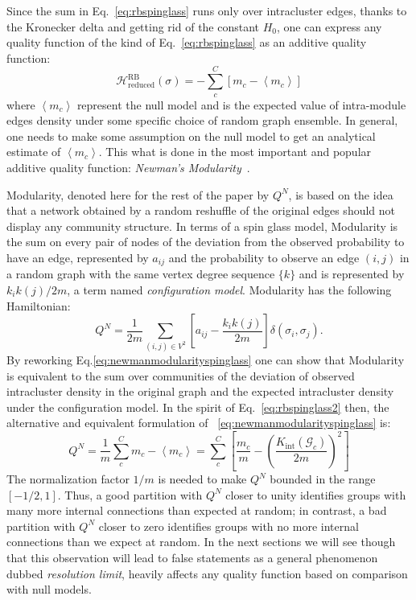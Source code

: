 Since the sum in Eq.~\ref{eq:rbspinglass} runs only over intracluster edges, thanks to the Kronecker delta and getting rid of the constant $H_0$, one can express any quality function of the kind of Eq.~\ref{eq:rbspinglass} as an additive quality function:
\begin{equation}\label{eq:rbspinglass2}
\mathcal{H}^{\textrm{RB}}_{\textrm{reduced}}(\sigma) = - \sum \limits_{c}^C \left[ m_c - \left< m_c \right> \right]
\end{equation}
where $\left <m_c \right >$ represent the null model and is the expected value of intra-module edges density under some specific choice of random graph ensemble. In general, one needs to make some assumption on the null model to get an analytical estimate of $\left <m_c \right >$. This what is done in the most important and popular additive quality function: \emph{Newman's Modularity}~\cite{newman2006}.

Modularity, denoted here for the rest of the paper by $Q^N$, is based on the idea that a network obtained by a random reshuffle of the original edges should not display any community structure.
In terms of a spin glass model, Modularity is the sum on every pair of nodes of the deviation from the observed probability to have an edge, represented by $a_{ij}$ and the probability to observe an edge $(i,j)$ in a random graph with the same vertex degree sequence $\{ k \}$ and is represented by $k_ik(j)/2m$, a term named \emph{configuration model}. Modularity has the following Hamiltonian:
\begin{equation}\label{eq:newmanmodularityspinglass}
Q^N =  \frac{1}{2m} \sum_{ (i,j) \in V^2} \left[ a_{ij} - \frac{k_i k(j)}{2m} \right] \delta(\sigma_i,\sigma_j).
\end{equation}
By reworking Eq.\ref{eq:newmanmodularityspinglass} one can show that Modularity is equivalent to the sum over communities of the deviation of observed intracluster density in the original graph and the expected intracluster density under the configuration model.
In the spirit of Eq.~\ref{eq:rbspinglass2} then, the alternative and equivalent formulation of ~\ref{eq:newmanmodularityspinglass} is:
\begin{equation}\label{eq:newmanmodularity}
Q^N =  \frac{1}{m} \sum_c^C m_c - \left< m_c \right> = \sum_{c}^{C} \left[ \frac{m_c}{m} - \left( \frac{K_{\textrm{int}}(\mathcal{G}_c)}{2m} \right)^2 \right ] 
\end{equation}
The normalization factor $1/m$ is needed to make $Q^N$ bounded in the range $[-1/2,1]$. Thus, a good partition with $Q^N$ closer to unity identifies groups with many more internal connections than expected at random; in contrast, a bad partition with $Q^N$ closer to zero identifies groups with no more internal connections than we expect at random. In the next sections we will see though that this observation will lead to false statements as a general phenomenon dubbed \emph{resolution limit}, heavily affects any quality function based on comparison with null models.


